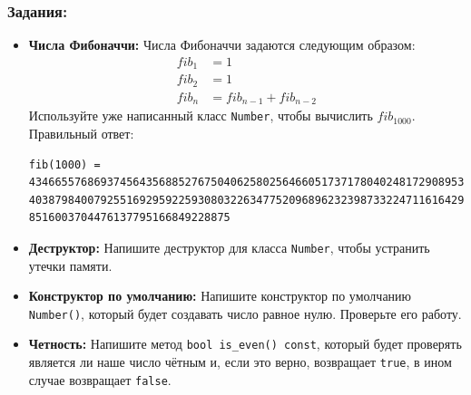 \documentclass{article}
\begin{document}
\subsubsection*{Задания:}
\begin{itemize}
\item \textbf{Числа Фибоначчи:} Числа Фибоначчи задаются следующим образом:
\begin{align*}
fib_1 &= 1\\
fib_2 &= 1\\
fib_n &= fib_{n-1} + fib_{n-2}
\end{align*}
Используйте уже написанный класс \texttt{Number}, чтобы вычислить $fib_{1000}$. Правильный ответ:
\begin{verbatim}
fib(1000) = 43466557686937456435688527675040625802564660517371780402481729089536555417949051890
40387984007925516929592259308032263477520968962323987332247116164299644090653318793829896964992
8516003704476137795166849228875
\end{verbatim}

\item \textbf{Деструктор:} Напишите деструктор для класса \texttt{Number}, чтобы устранить утечки памяти.

\item \textbf{Конструктор по умолчанию:} Напишите конструктор по умолчанию \texttt{Number()}, который будет создавать число равное нулю. Проверьте его работу.

\item \textbf{Четность:} Напишите метод \texttt{bool is\_even() const}, который будет проверять является ли наше число чётным и, если это верно, возвращает \texttt{true}, в ином случае возвращает \texttt{false}.


\end{itemize}
\end{document}
